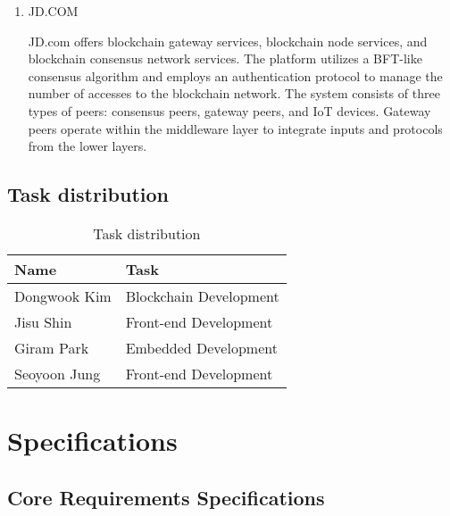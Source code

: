 \documentclass[conference]{IEEEtran}
\begin{document}
\begin{enumerate}[itemsep=2ex, parsep=1ex]
		\item JD.COM

			JD.com offers blockchain gateway services, blockchain node services, and
			blockchain consensus network services. The platform utilizes a BFT-like consensus
			algorithm and employs an authentication protocol to manage the number of accesses
			to the blockchain network. The system consists of three types of peers: consensus
			peers, gateway peers, and IoT devices. Gateway peers operate within the
			middleware layer to integrate inputs and protocols from the lower layers.
	\end{enumerate}

	\vspace{3cm}

	\subsection{Task distribution }

	\begin{table}[h]
		\caption{Task distribution}
		\def\arraystretch{1.4} \small
		\begin{tabular}{|p{3cm}|p{4.6cm}|}
			\hline
			Name         & Task                   \\
			\hline
			Dongwook Kim & Blockchain Development \\
			\hline
			Jisu Shin    & Front-end Development  \\
			\hline
			Giram Park   & Embedded Development   \\
			\hline
			Seoyoon Jung & Front-end Development  \\
			\hline
		\end{tabular}
	\end{table}

	\section{Specifications}

	\subsection{Core Requirements Specifications}
\end{document}
